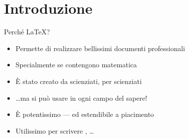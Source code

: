 \documentclass{beamer}
\subtitle{Parte 1: Le basi}
\begin{document}
\begin{frame}
\titlepage
\end{frame}

\section{Introduzione}
\begin{frame}{Perch\'e \LaTeX{}?}
\begin{itemize}
\item Permette di realizzare bellissimi documenti professionali
\item Specialmente se contengono matematica
%
\item \`E stato creato da scienziati, per scienziati
\item \ldots ma si pu\`o usare in ogni campo del sapere!
%
\item \`E potentissimo --- ed estendibile a piacimento
\item Utilissimo per scrivere , \ldots 
\end{itemize}
\end{frame}
\end{document}
